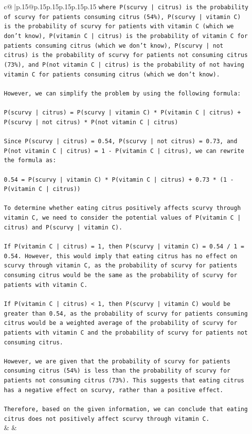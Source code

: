 \documentclass{article}
\begin{document}
{\begin{supertabular}{c@{$\;$}|p{.15\linewidth}@{}p{.15\linewidth}p{.15\linewidth}p{.15\linewidth}p{.15\linewidth}p{.15\linewidth}}
{{{\texttt{where P(scurvy | citrus) is the probability of scurvy for patients consuming citrus (54\%), P(scurvy | vitamin C) is the probability of scurvy for patients with vitamin C (which we don't know), P(vitamin C | citrus) is the probability of vitamin C for patients consuming citrus (which we don't know), P(scurvy | not citrus) is the probability of scurvy for patients not consuming citrus (73\%), and P(not vitamin C | citrus) is the probability of not having vitamin C for patients consuming citrus (which we don't know).} \\
\\ 
\texttt{However, we can simplify the problem by using the following formula:} \\
\\ 
\texttt{P(scurvy | citrus) = P(scurvy | vitamin C) * P(vitamin C | citrus) + P(scurvy | not citrus) * P(not vitamin C | citrus)} \\
\\ 
\texttt{Since P(scurvy | citrus) = 0.54, P(scurvy | not citrus) = 0.73, and P(not vitamin C | citrus) = 1 {-} P(vitamin C | citrus), we can rewrite the formula as:} \\
\\ 
\texttt{0.54 = P(scurvy | vitamin C) * P(vitamin C | citrus) + 0.73 * (1 {-} P(vitamin C | citrus))} \\
\\ 
\texttt{To determine whether eating citrus positively affects scurvy through vitamin C, we need to consider the potential values of P(vitamin C | citrus) and P(scurvy | vitamin C).} \\
\\ 
\texttt{If P(vitamin C | citrus) = 1, then P(scurvy | vitamin C) = 0.54 / 1 = 0.54. However, this would imply that eating citrus has no effect on scurvy through vitamin C, as the probability of scurvy for patients consuming citrus would be the same as the probability of scurvy for patients with vitamin C.} \\
\\ 
\texttt{If P(vitamin C | citrus) < 1, then P(scurvy | vitamin C) would be greater than 0.54, as the probability of scurvy for patients consuming citrus would be a weighted average of the probability of scurvy for patients with vitamin C and the probability of scurvy for patients not consuming citrus.} \\
\\ 
\texttt{However, we are given that the probability of scurvy for patients consuming citrus (54\%) is less than the probability of scurvy for patients not consuming citrus (73\%). This suggests that eating citrus has a negative effect on scurvy, rather than a positive effect.} \\
\\ 
\texttt{Therefore, based on the given information, we can conclude that eating citrus does not positively affect scurvy through vitamin C.} \\
            }
        }
    }
    & & \\ \\


\end{supertabular}}
\end{document}
